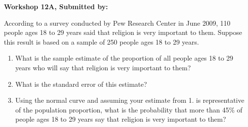 \documentclass[11pt]{book}\usepackage[]{graphicx}\usepackage[]{color}
\begin{document}
\clearpage
\begin{exercises}
    \begin{exercise}  %

    \begin{center}
\begin{flushleft}\textbf{\large \hfill Workshop 12A, Submitted by: }\end{flushleft}

\end{center}

According to a survey conducted by Pew Research Center in June 2009, 110 people ages 18 to 29 years said that religion is very important to them. Suppose this result is based on a sample of 250 people ages 18 to 29 years.

\begin{enumerate}
  \item What is the sample estimate of the proportion of all people ages 18 to 29 years who will say that religion is very important to them?
  \item What is the standard error of this estimate?
  \item Using the normal curve and assuming your estimate from 1. is representative of the population proportion, what is the probability that more than 45\% of people ages 18 to 29 years say that religion is very important to them?
\end{enumerate}

\end{exercise} 
\begin{solution}  %

\end{solution}

\clearpage


\end{exercises}
\end{document}
